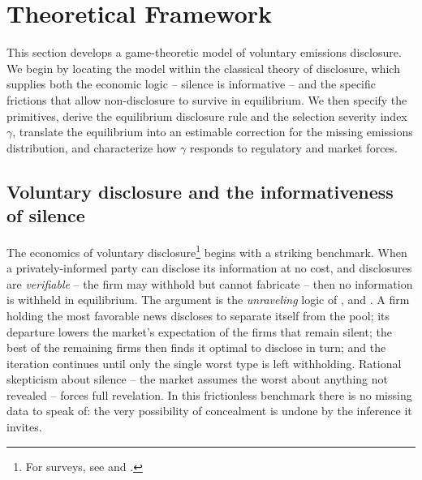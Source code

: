 \documentclass[a4paper,12pt]{article}
\newcommand{\citet}[1]{\textcite{#1}}
\begin{document}


\section{Theoretical Framework}
\label{sec:theory}

This section develops a game-theoretic model of voluntary emissions disclosure. We begin by locating the model within the classical theory of disclosure, which supplies both the economic logic --  silence is informative --  and the specific frictions that allow non-disclosure to survive in equilibrium. We then specify the primitives, derive the equilibrium disclosure rule and the selection severity index $\gamma$, translate the equilibrium into an estimable correction for the missing emissions distribution, and characterize how $\gamma$ responds to regulatory and market forces.

\subsection{Voluntary disclosure and the informativeness of silence}
\label{subsec:disclosure_theory}

The economics of voluntary disclosure\footnote{For surveys, see \citet{verrecchia2001essays} and \citet{beyer2010financial}.} begins with a striking benchmark. When a privately-informed party can disclose its information at no cost, and disclosures are \emph{verifiable} --  the firm may withhold but cannot fabricate --  then no information is withheld in equilibrium. The argument is the \emph{unraveling} logic of \citet{grossman1980disclosure}, \citet{grossman1981informational} and \citet{milgrom1981good}. A firm holding the most favorable news discloses to separate itself from the pool; its departure lowers the market's expectation of the firms that remain silent; the best of the remaining firms then finds it optimal to disclose in turn; and the iteration continues until only the single worst type is left withholding. Rational skepticism about silence --  the market assumes the worst about anything not revealed --  forces full revelation. In this frictionless benchmark there is no missing data to speak of: the very possibility of concealment is undone by the inference it invites.
\end{document}
